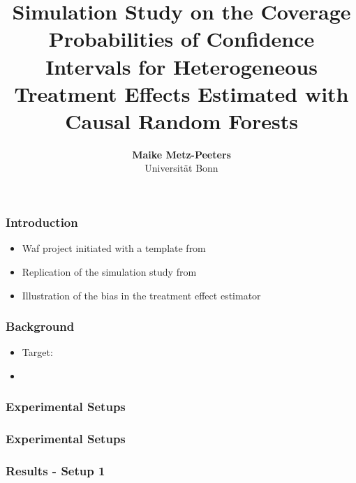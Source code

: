 \documentclass[11pt]{beamer}
\begin{document}
\title{ Simulation Study on the Coverage Probabilities of Confidence Intervals for Heterogeneous Treatment Effects Estimated with Causal Random Forests}

\author[Maike Metz-Peeters]
{
{\bf Maike Metz-Peeters}\\
{\small Universität Bonn}\\[1ex]
}


\begin{frame}
    \titlepage
    \note{~}
\end{frame}



\begin{frame}
    \frametitle{Introduction}
    \begin{itemize}
        \item Waf project initiated with a template from \citet{GaudeckerEconProjectTemplates}
        \item Replication of the simulation study from \citet{wa18}
        \item Illustration of the bias in the treatment effect estimator
    \end{itemize}
\end{frame}

\begin{frame}
    \frametitle{Background}
    \begin{itemize}
        \item Target: 
        \item \citet{wa18} 
    \end{itemize}
\end{frame}

\begin{frame}
    \frametitle{Experimental Setups}

     

\end{frame}


\begin{frame}
    \frametitle{Experimental Setups}

     

\end{frame}



\begin{frame}
    \frametitle{Results - Setup 1}
    
    

\end{frame}
\end{document}
